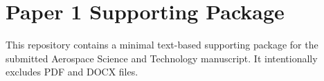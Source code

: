 \documentclass[12pt]{article}
\begin{document}
\section*{Paper 1 Supporting Package}
This repository contains a minimal text-based supporting package for the submitted Aerospace Science and Technology manuscript.
It intentionally excludes PDF and DOCX files.


\end{document}
